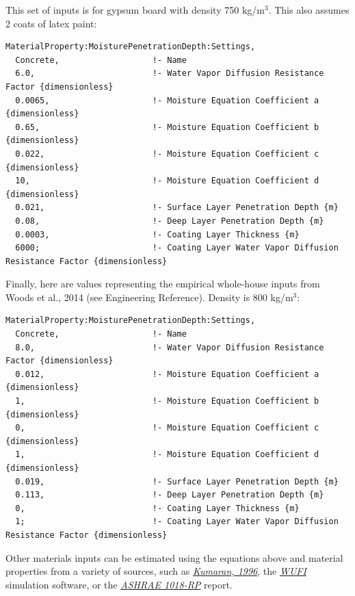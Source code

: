This set of inputs is for gypsum board with density 750 kg/m$^3$. This also assumes 2 coats of latex paint:

\begin{lstlisting}
MaterialProperty:MoisturePenetrationDepth:Settings,
  Concrete,                   !- Name
  6.0,                        !- Water Vapor Diffusion Resistance Factor {dimensionless}
  0.0065,                     !- Moisture Equation Coefficient a {dimensionless}
  0.65,                       !- Moisture Equation Coefficient b {dimensionless}
  0.022,                      !- Moisture Equation Coefficient c {dimensionless}
  10,                         !- Moisture Equation Coefficient d {dimensionless}
  0.021,                      !- Surface Layer Penetration Depth {m}
  0.08,                       !- Deep Layer Penetration Depth {m}
  0.0003,                     !- Coating Layer Thickness {m}
  6000;                       !- Coating Layer Water Vapor Diffusion Resistance Factor {dimensionless}
\end{lstlisting}

Finally, here are values representing the empirical whole-house inputs from Woods et al., 2014 (see Engineering Reference). Density is 800 kg/m$^3$:

\begin{lstlisting}
MaterialProperty:MoisturePenetrationDepth:Settings,
  Concrete,                   !- Name
  8.0,                        !- Water Vapor Diffusion Resistance Factor {dimensionless}
  0.012,                      !- Moisture Equation Coefficient a {dimensionless}
  1,                          !- Moisture Equation Coefficient b {dimensionless}
  0,                          !- Moisture Equation Coefficient c {dimensionless}
  1,                          !- Moisture Equation Coefficient d {dimensionless}
  0.019,                      !- Surface Layer Penetration Depth {m}
  0.113,                      !- Deep Layer Penetration Depth {m}
  0,                          !- Coating Layer Thickness {m}
  1;                          !- Coating Layer Water Vapor Diffusion Resistance Factor {dimensionless}
\end{lstlisting}

Other materials inputs can be estimated using the equations above and material properties from a variety of sources, such as \href{http://www.iea-ebc.org/fileadmin/user_upload/images/Pictures/EBC_Annex_24_Report_3.pdf}{\emph{Kumaran, 		1996}}, the \href{http://WUFI.de/en/}{\emph{WUFI}} simulation software, or the \href{http://www.techstreet.com/products/1719052}{\emph{ASHRAE 1018-RP}} report.

